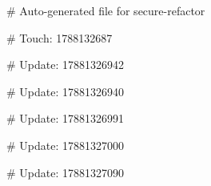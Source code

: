 # Auto-generated file for secure-refactor

# Touch: 1788132687

# Update: 17881326942

# Update: 17881326940

# Update: 17881326991

# Update: 17881327000

# Update: 17881327090

